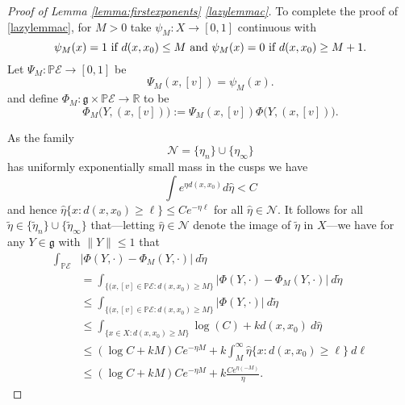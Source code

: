 \documentclass[10pt,reqno]{amsart}
\theoremstyle{Theorem}
\theoremstyle{definition}
\theoremstyle{remark}
\newcommand{\note}[1]{\marginpar{{\color{red}\footnotesize \begin{spacing}{1}#1\end{spacing}}}}
\newcommand{\td}{\tilde}
\newcommand{\R}{\mathbb {R}}
\def\calA{\mathcal A}
\def\calE{\mathcal E}
\newcommand{\lieg}{\mathfrak g}
\renewcommand\P{\mathbb{P}}
\def\red{\color{red}}
\def\blue{}
\begin{document}
\begin{proof}[Proof of Lemma \ref{lemma:firstexponents} \ref{lazylemmac}]
To complete the proof of \ref{lazylemmac}, for  $M>0$     take $\psi_M\colon X\to [0,1]$ continuous with $$ \text{$ \psi_M(x) = 1$ if $d(x,x_0) \le M$ and $\psi_M(x) = 0$ if $d(x,x_0)\ge M+ 1$}.$$
Let $\Psi_M\colon \P\calE \to [0,1]$ be $$\Psi_M(x,[v]) = \psi_M(x).$$
and define $\Phi_M \colon \lieg\times \P\calE\to \R$ to be
$$\Phi_M\big(Y,(x, [v])\big) :=\Psi_M(x, [v]) \Phi\big(Y,(x, [v])\big).$$

As the family $$  \mathcal N= \{\eta_n\} \cup\{\eta_\infty\}$$ has uniformly exponentially small mass in the cusps we have
$$\int e^{\eta d(x,x_0)} d \hat \eta <C$$
 and hence $\hat \eta\{x: d(x,x_0)\ge \ell \} \le Ce^{-\eta\ell}$
for all $\hat \eta \in   \mathcal N$.
It follows for all $\td  \eta\in  \{\td \eta_n\} \cup\{\td \eta_\infty\}$  that---letting $\hat  \eta\in \mathcal N$ denote the image of $ \td  \eta$ in $X$---we have for any $Y\in \lieg$  with $\|Y\|\le 1$ that
\begin{align*}
	\int_{ \P\calE} &|\Phi(Y, \cdot ) - \Phi_M(Y, \cdot )| \ d  \td  \eta
		\\&= \int_{\{(x,[v]\in \P\calE: d(x,x_0)\ge  M\}} |\Phi (Y, \cdot ) - \Phi_M (Y, \cdot ) | \ d  {\td \eta}
				\\&\le \int_{\{(x,[v]\in \P\calE: d(x,x_0)\ge  M\}}  |\Phi (Y, \cdot ) | \ d  {\td \eta}
		\\&\le \int_{\{x\in X: d(x,x_0)\ge  M\}}  \log(C) + {k d(x,x_0)} \ d \hat  \eta
	\\& \le {\blue  (\log C + k M)Ce^{-\eta M}   + k \int_{ M}^\infty  \hat \eta \{ x:  { d(x,x_0)}\ge \ell\} \  d \ell}
	  \\ &\le (\log C + k M) C e^{-\eta M}  + k\frac{C e^{\eta  (- M)}}{\eta }.
		\end{align*}
%

\end{proof}
\end{document}
